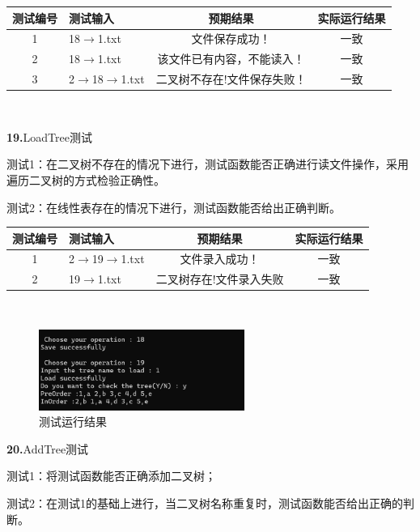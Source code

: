 \documentclass[supercite]{Experimental_Report}
\theoremstyle{definition}
\begin{document}
\vspace{0.5em}

\begin{tabular}{|c|p{2.7cm}|c|c|}
	\hline
	测试编号 & 测试输入 & 预期结果 & 实际运行结果 \\
	\hline
	1 & 18$\rightarrow$1.txt & 文件保存成功！ & 一致 \\
	\hline
	2 & 18$\rightarrow$1.txt & 该文件已有内容，不能读入！ & 一致 \\
	\hline
	3 & 2$\rightarrow$18$\rightarrow$1.txt & 二叉树不存在!文件保存失败！ & 一致 \\
	\hline
\end{tabular}

~\

\noindent\textbf{19.}LoadTree测试

测试1：在二叉树不存在的情况下进行，测试函数能否正确进行读文件操作，采用遍历二叉树的方式检验正确性。

测试2：在线性表存在的情况下进行，测试函数能否给出正确判断。

\vspace{0.5em}

\begin{tabular}{|c|p{2.7cm}|c|c|}
	\hline
	测试编号 & 测试输入 & 预期结果 & 实际运行结果 \\
	\hline
	1 & 2$\rightarrow$19$\rightarrow$1.txt & 文件录入成功！ & 一致 \\
	\hline
	2 & 19$\rightarrow$1.txt & 二叉树存在!文件录入失败 & 一致 \\
	\hline
\end{tabular}

~\

\begin{figure}[H]
 	\centering
 	\includegraphics[width=0.6\textwidth]{images/二叉树测试18_19.png}
 	\caption{测试运行结果}
 	\label{txlab}
 \end{figure}

\noindent\textbf{20.}AddTree测试

测试1：将测试函数能否正确添加二叉树；

测试2：在测试1的基础上进行，当二叉树名称重复时，测试函数能否给出正确的判断。
\end{document}
